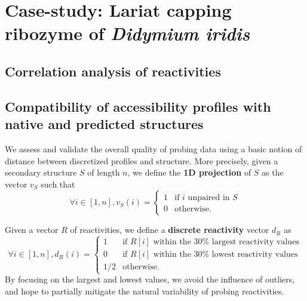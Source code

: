 \documentclass[11pt]{article} %
\begin{document}





\section{Case-study: Lariat capping ribozyme of {\itshape Didymium iridis}}
\subsection{Correlation analysis of reactivities}
\subsection{Compatibility of accessibility profiles with native and predicted structures}
We assess and validate the overall quality of probing data using a basic notion of distance between discretized profiles and structure. More precisely, given a secondary structure $S$ of length $n$, we define the {\bf 1D projection} of $S$ as the vector $v_S$ such that
$$ \forall i\in[1,n], v_S(i)=\begin{cases} 1 &\text{if $i$ unpaired in $S$}\\ 0 &\text{otherwise.} \end{cases} $$

Given a vector $R$ of reactivities, we define a {\bf discrete reactivity} vector $d_R$ as
$$ \forall i\in[1,n], d_R(i)=\begin{cases} 1 &\text{if $R[i]$ within the $30\%$ largest reactivity values}\\ 
0 & \text{if $R[i]$ within the $30\%$ lowest reactivity values}\\
1/2 &\text{otherwise.} \end{cases} $$
By focusing on the largest and lowest values, we avoid the influence of outliers, and hope to partially mitigate the natural variability of probing reactivities.
\end{document}
